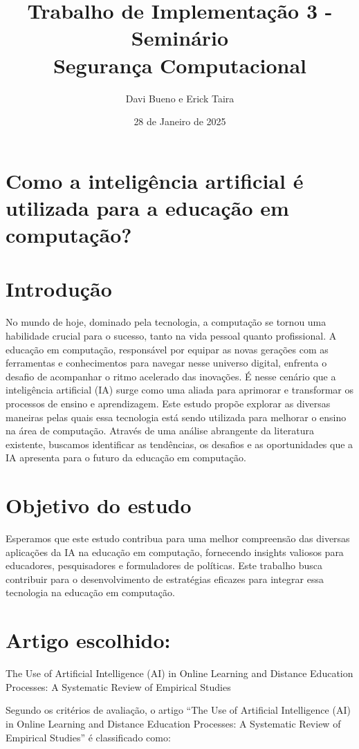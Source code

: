 \documentclass{article}
\title{Trabalho de Implementação 3 - Seminário \\
        Segurança Computacional}
\author{Davi Bueno e Erick Taira}
\date{28 de Janeiro de 2025}
\begin{document}
\maketitle

\section*{Como a inteligência artificial é utilizada para a educação em computação?}

\section{Introdução}
No mundo de hoje, dominado pela tecnologia, a computação se tornou uma habilidade crucial para o sucesso, tanto na vida pessoal quanto profissional. A educação em computação, responsável por equipar as novas gerações com as ferramentas e conhecimentos para navegar nesse universo digital, enfrenta o desafio de acompanhar o ritmo acelerado das inovações. É nesse cenário que a inteligência artificial (IA) surge como uma aliada para aprimorar e transformar os processos de ensino e aprendizagem. Este estudo propõe explorar as diversas maneiras pelas quais essa tecnologia está sendo utilizada para melhorar o ensino na área de computação. Através de uma análise abrangente da literatura existente, buscamos identificar as tendências, os desafios e as oportunidades que a IA apresenta para o futuro da educação em computação.

\section{Objetivo do estudo}
Esperamos que este estudo contribua para uma melhor compreensão das diversas aplicações da IA na educação em computação, fornecendo insights valiosos para educadores, pesquisadores e formuladores de políticas. Este trabalho busca contribuir para o desenvolvimento de estratégias eficazes para integrar essa tecnologia na educação em computação.

\section{Artigo escolhido:}

The Use of Artificial Intelligence (AI) in Online Learning and Distance Education Processes: A Systematic Review of Empirical Studies

Segundo os critérios de avaliação, o artigo “The Use of Artificial Intelligence (AI) in Online Learning and Distance Education Processes: A Systematic Review of Empirical Studies” é classificado como:
\end{document}

